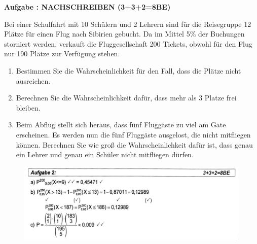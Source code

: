 \documentclass[a4paper,12pt]{article}
\newcounter{aufgabencounter}
\newcommand{\aufgabeNr}{\stepcounter{aufgabencounter}{\theaufgabencounter}}
\newcommand{\Aufgabe}[1]{
  {
  \vspace*{0.5cm}
  \textsf{\textbf{Aufgabe \aufgabeNr #1}}
  \vspace*{0.2cm}
  
  }
}
\begin{document}
\Aufgabe{: NACHSCHREIBEN (3+3+2=8BE)}
Bei einer Schulfahrt mit 10 Schülern und 2 Lehrern sind für die Reisegruppe 12 Plätze für einen Flug nach Sibirien gebucht. Da im Mittel 5\% der Buchungen storniert werden, verkauft die Fluggesellschaft 200 Tickets, obwohl für den Flug nur 190 Plätze zur Verfügung stehen.
\begin{enumerate}[label={\alph*)}]
  \item Bestimmen Sie die Wahrscheinlichkeit für den Fall, dass die Plätze nicht ausreichen.
  \item Berechnen Sie die Wahrscheinlichkeit dafür, dass mehr als 3 Platze frei bleiben.
  \item Beim Abflug stellt sich heraus, dass fünf Fluggäste zu viel am Gate erscheinen. Es werden nun die fünf Fluggäste ausgelost, die nicht mitfliegen können. Berechnen Sie wie groß die Wahrscheinlichkeit dafür ist, dass genau ein Lehrer und genau ein Schüler nicht mitfliegen dürfen.
\end{enumerate}

  \begin{figure}[H]
    \vspace{0cm}
    \centering
    \includegraphics[width=1\linewidth]{ml_240215_2a.jpg}
  \end{figure}
\end{document}
